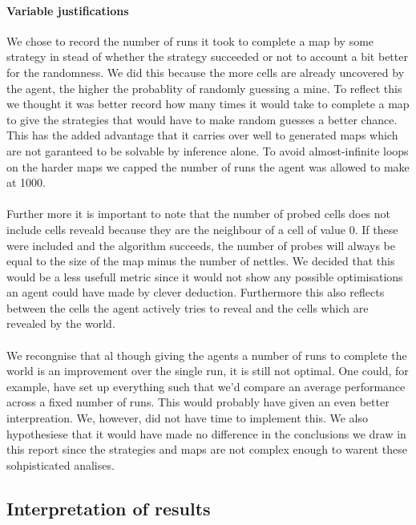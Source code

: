 \documentclass[british]{article}
\begin{document}
\paragraph{Variable justifications}We chose to record the number of runs it took to complete a map by some strategy in stead of whether the strategy succeeded or not to account a bit better for the randomness. We did this because the more cells are already uncovered by the agent, the higher the probablity of randomly guessing a mine. To reflect this we thought it was better record how many times it would take to complete a map to give the strategies that would have to make random guesses a better chance. This has the added advantage that it carries over well to generated maps which are not garanteed to be solvable by inference alone. To avoid almost-infinite loops on the harder maps we capped the number of runs the agent was allowed to make at 1000. 

\paragraph{}Further more it is important to note that the number of probed cells does not include cells reveald because they are the neighbour of a cell of value 0. If these were included and the algorithm succeeds, the number of probes will always be equal to the size of the map minus the number of nettles. We decided that this would be a less usefull metric since it would not show any possible optimisations an agent could have made by clever deduction. Furthermore this also reflects between the cells the agent actively tries to reveal and the cells which are revealed by the world. 

\paragraph{} We recongnise that al though giving the agents a number of runs to complete the world is an improvement over the single run, it is still not optimal. One could, for example, have set up everything such that we'd compare an average performance across a fixed number of runs. This would probably have given an even better interpreation. We, however, did not have time to implement this. We also hypothesiese that it would have made no difference in the conclusions we draw in this report since the strategies and maps are not complex enough to warent these sohpisticated analises. 

\subsection{Interpretation of results}
\label{interpretation}
\end{document}

